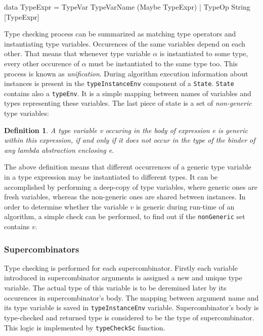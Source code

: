 \documentclass[12pt,a4paper]{report}
\newtheorem{definition}{Definition}[chapter]
\begin{document}
\vspace*{0.2in}
\begin{code}[style=haskell]
  data TypeExpr = TypeVar TypeVarName (Maybe TypeExpr)
                | TypeOp String [TypeExpr]
\end{code}

Type checking process can be summarized as matching type operators and
instantiating type variables. Occurences of the same variables depend on each
other. That means that whenever type variable $\alpha$ is instantiated to some
type, every other occurence of $\alpha$ must be instantiated to the same type
too. This process is known as \textit{unification}. During algorithm execution
information about instances is present in the \texttt{typeInstanceEnv}
component of a \texttt{State}. \texttt{State} contains also a \texttt{typeEnv}.
It is a simple mapping between names of variables and types representing these
variables. The last piece of state is a set of \textit{non-generic} type
variables:

\begin{definition}
  A type variable v occuring in the body of expression e is generic within this
  expression, if and only if it does not occur in the type of the binder of any
  lambda abstraction enclosing e.
\end{definition}

The above definition means that different occurrences of a generic type
variable in a type expression may be instantiated to different types. It can be
accomplished by performing a deep-copy of type variables, where generic ones are
fresh variables, whereas the non-generic ones are shared between instances.  In
order to determine whether the variable $v$ is generic during run-time of an
algorithm, a simple check can be performed, to find out if the
\texttt{nonGeneric} set contains $v$.

\subsubsection{Supercombinators}
Type checking is performed for each supercombinator. Firstly each variable
introduced in supercombinator arguments is assigned a new and unique type
variable. The actual type of this variable is to be deremined later by its
occurences in supercombinator's body. The mapping between argument name and its
type variable is saved in \texttt{typeInstanceEnv} variable. Supercombinator's
body is type-checked and returned type is considered to be the type of
supercombinator. This logic is implemented by \texttt{typeCheckSc} function.
\end{document}

